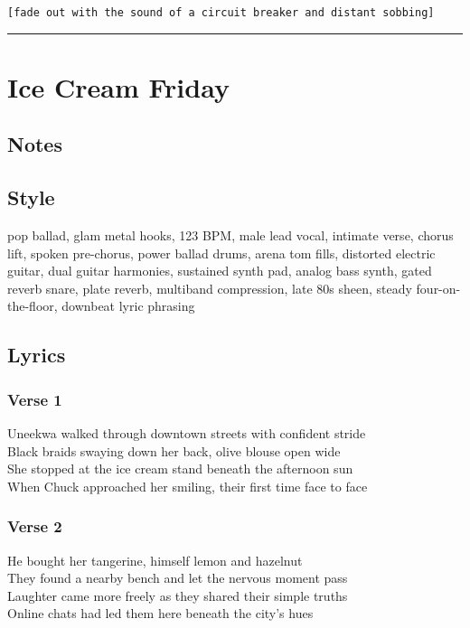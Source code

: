 \texttt{{[}fade\ out\ with\ the\ sound\ of\ a\ circuit\ breaker\ and\ distant\ sobbing{]}}

\begin{center}\rule{0.5\linewidth}{0.5pt}\end{center}

\section{Ice Cream Friday}\label{ice-cream-friday}

\subsection{Notes}\label{notes-39}

\subsection{Style}\label{style-38}

pop ballad, glam metal hooks, 123 BPM, male lead vocal, intimate verse,
chorus lift, spoken pre-chorus, power ballad drums, arena tom fills,
distorted electric guitar, dual guitar harmonies, sustained synth pad,
analog bass synth, gated reverb snare, plate reverb, multiband
compression, late 80s sheen, steady four-on-the-floor, downbeat lyric
phrasing

\subsection{Lyrics}\label{lyrics-38}

\subsubsection{Verse 1}\label{verse-1-21}

Uneekwa walked through downtown streets with confident stride\\
Black braids swaying down her back, olive blouse open wide\\
She stopped at the ice cream stand beneath the afternoon sun\\
When Chuck approached her smiling, their first time face to face

\subsubsection{Verse 2}\label{verse-2-22}

He bought her tangerine, himself lemon and hazelnut\\
They found a nearby bench and let the nervous moment pass\\
Laughter came more freely as they shared their simple truths\\
Online chats had led them here beneath the city's hues

